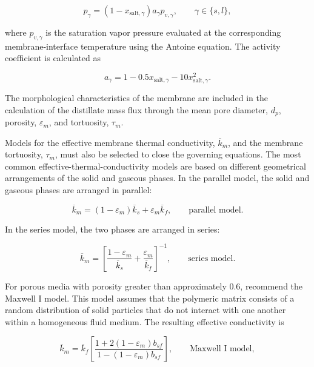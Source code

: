 \documentclass[14pt,letterpaper,fleqn]{extarticle}
\begin{document}
\begin{equation}
p_\gamma
=
\left(
1-x_{\mathrm{salt},\gamma}
\right)
a_\gamma p_{v,\gamma},
\qquad
\gamma\in\{s,l\},
\label{eq:interfacial-vapor-pressure}
\end{equation}

where $p_{v,\gamma}$ is the saturation vapor pressure evaluated at the
corresponding membrane-interface temperature using the Antoine equation. The activity 
coefficient is calculated as

\begin{equation}
a_\gamma
=
1
-
0.5x_{\mathrm{salt},\gamma}
-
10x_{\mathrm{salt},\gamma}^{2}.
\label{eq:water-activity-coefficient}
\end{equation}

The morphological characteristics of the membrane are included in the
calculation of the distillate mass flux through the mean pore diameter, $d_p$,
porosity, $\varepsilon_m$, and tortuosity, $\tau_m$.

Models for the effective membrane thermal conductivity,
$\overline{k}_m$, and the membrane tortuosity, $\tau_m$, must also be selected
to close the governing equations. The most common effective-thermal-conductivity
models are based on different geometrical arrangements of the solid and gaseous
phases. In the parallel model, the solid and gaseous phases are arranged in
parallel:

\begin{equation}
\overline{k}_m
=
\left(
1-\varepsilon_m
\right)
\overline{k}_s
+
\varepsilon_m\overline{k}_f,
\qquad
\text{parallel model}.
\label{eq:parallel-conductivity}
\end{equation}

In the series model, the two phases are arranged in series:

\begin{equation}
\overline{k}_m
=
\left[
\frac{
1-\varepsilon_m
}{
\overline{k}_s
}
+
\frac{
\varepsilon_m
}{
\overline{k}_f
}
\right]^{-1},
\qquad
\text{series model}.
\label{eq:series-conductivity}
\end{equation}

For porous media with porosity greater than approximately 0.6,
\citet{GarciaPayoIzquierdoGil2004} recommend the Maxwell I model. This model
assumes that the polymeric matrix consists of a random distribution of solid
particles that do not interact with one another within a homogeneous fluid
medium. The resulting effective conductivity is

\begin{equation}
\overline{k}_m
=
\overline{k}_f
\left[
\frac{
1+2\left(1-\varepsilon_m\right)b_{sf}
}{
1-\left(1-\varepsilon_m\right)b_{sf}
}
\right],
\qquad
\text{Maxwell I model},
\label{eq:maxwell-conductivity}
\end{equation}
\end{document}
